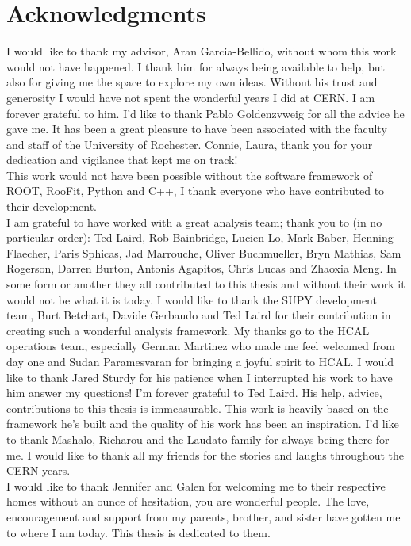 \section*{Acknowledgments}

\indent I would like to thank my advisor, Aran Garcia-Bellido, without whom this work would not have happened. 
I thank him for always being available to help, but also for giving me the space to explore my own ideas. 
Without his trust and generosity I would have not spent the wonderful years I did at CERN. I am forever 
grateful to him. I'd like to thank Pablo Goldenzvweig for all the advice he gave me. It has been a great 
pleasure to have been associated with the faculty and staff of the University of Rochester. Connie, Laura, 
thank you for your dedication and vigilance that kept me on track! \\
\indent This work would not have been possible without the software framework of ROOT, RooFit, Python and C++, I thank
everyone who have contributed to their development.\\
\indent I am grateful to have worked with a great analysis team; thank you to (in no particular order): Ted Laird, 
Rob Bainbridge, Lucien Lo, Mark Baber, Henning Flaecher, Paris Sphicas, Jad Marrouche, Oliver Buchmueller, 
Bryn Mathias, Sam Rogerson, Darren Burton, Antonis Agapitos, Chris Lucas and Zhaoxia Meng. In some form or 
another they all contributed to this thesis and without their work it would not be what it is today. 
I would like to thank the SUPY development team, Burt Betchart, Davide Gerbaudo and Ted Laird for their contribution 
in creating such a wonderful analysis framework. My thanks go to the HCAL operations team, especially German 
Martinez who made me feel welcomed from day one and Sudan Paramesvaran for bringing a joyful spirit to HCAL.
I would like to thank Jared Sturdy for his patience when I interrupted his work to have him answer my questions! 
I'm forever grateful to Ted Laird. His help, advice, contributions to this thesis is immeasurable. This work is
heavily based on the framework he's built and the quality of his work has been an inspiration. I'd like to thank 
Mashalo, Richarou and the Laudato family for always being there for me. I would like to thank all my friends for 
the stories and laughs throughout the CERN years. \\
\indent I would like to thank Jennifer and Galen for welcoming me to their respective homes without
an ounce of hesitation, you are wonderful people. 
The love, encouragement and support from my parents, brother, and sister have gotten me to where I am today.
This thesis is dedicated to them. 
